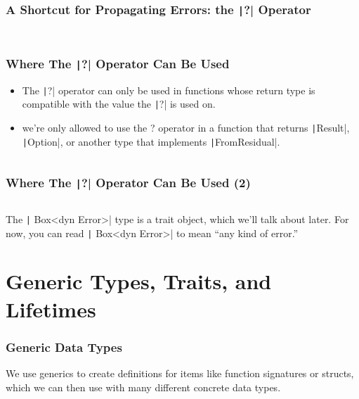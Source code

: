 \documentclass{beamer}
\begin{document}
\begin{frame}[fragile]
	\frametitle{A Shortcut for Propagating Errors: the \texttt|?| Operator}
	\inputminted[fontsize=\scriptsize]{rust}{./code/result9.rs}
	
	\inputminted[fontsize=\scriptsize]{rust}{./code/result10.rs}
\end{frame}

\begin{frame}[fragile]
	\frametitle{Where The \texttt|?| Operator Can Be Used}
		\begin{itemize}
			\item 	The \texttt|?| operator can only be used in functions whose return type is compatible with the value the \texttt|?| is used on.
			\item 	we’re only allowed to use the ? operator in a function that returns \texttt|Result|, \texttt|Option|, or another type that implements \texttt|FromResidual|.
		\end{itemize}
	
	\inputminted{rust}{./code/result11.rs}
\end{frame}

\begin{frame}[fragile]
	\frametitle{Where The \texttt|?| Operator Can Be Used (2)}
	\inputminted{rust}{./code/result12.rs}
	
	The \texttt| Box<dyn Error>| type is a trait object, which we’ll talk about later. For now, you can read \texttt| Box<dyn Error>|  to mean “any kind of error.” 
	
\end{frame}

\section{Generic Types, Traits, and Lifetimes}

\begin{frame}[fragile]
	\frametitle{Generic Data Types}
	We use generics to create definitions for items like function signatures or structs, which we can then use with many different concrete data types.

	\begin{columns}
			\inputminted{rust}{./code/generic1.rs}
			\inputminted{rust}{./code/generic2.rs}
	\end{columns}
\end{frame}
\end{document}
